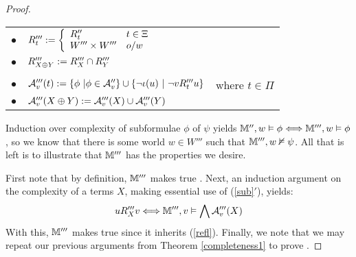 \begin{proof}
  \begin{center}
    \begin{tabular}{lll}
      $\bullet$ & $R'''_t \assign \left\{ \begin{array}{ll}
        R''_t & t \in \Xi\\
        W''' \times W''' & o / w
      \end{array} \right.$ & \\
      $\bullet$ & $R'''_{X \oplus Y} \assign R'''_X \cap R'''_Y$ & \\
      &  & \\
      $\bullet$ & $\mathcal{A}'''_v (t) \assign \{\phi \  | \phi \in
      \mathcal{A}''_v \} \cup \{\neg \iota (u) \  | \ 
      \neg v R'''_t u\}$ & where $t \in \Pi$\\
      $\bullet$ & $\mathcal{A}'''_v (X \oplus Y) \assign \mathcal{A}'''_v (X)
      \cup \mathcal{A}'''_v (Y)$ & 
    \end{tabular}
  \end{center}
  
  
  
  
  
  Induction over complexity of subformulae $\phi$ of $\psi$ yields
  $\mathbbm{M}'', w \vDash \phi \Longleftrightarrow \mathbbm{M}''', w \vDash
  \phi$, so we know that there is some world $w \in W'''$ such that
  $\mathbbm{M}''', w \nvDash \psi$.  All that is left is to illustrate that
  $\mathbbm{M}'''$ has the properties we desire.
  
  
  
  First note that by definition, $\mathbbm{M}'''$ makes true
  .  Next, an induction argument on the complexity of a
  terms $X$, making essential use of (\ref{sub}$'$), yields:
  \[ u R_X''' v \Longleftrightarrow \mathbbm{M}''', v \vDash \bigwedge
     \mathcal{A}'''_v (X) \]
  With this, $\mathbbm{M}'''$ makes true  since it inherits
  (\ref{refl}).  Finally, we note that we may repeat our previous arguments
  from Theorem \ref{completeness1} to prove \tmtextbf{JCSQ}.
\end{proof}
